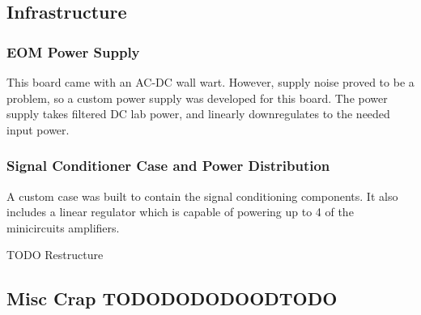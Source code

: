 \subsection{Infrastructure}
    \subsubsection{EOM Power Supply}

This board came with an AC-DC wall wart.  However, supply noise proved to be a problem, so a custom power supply was developed for this board.  The power supply takes filtered DC lab power, and linearly downregulates to the needed input power.

    \subsubsection{Signal Conditioner Case and Power Distribution}

A custom case was built to contain the signal conditioning components.  It also includes a linear regulator which is capable of powering up to 4 of the minicircuits amplifiers.


TODO Restructure

\subsection{Misc Crap TODODODODOODTODO}

